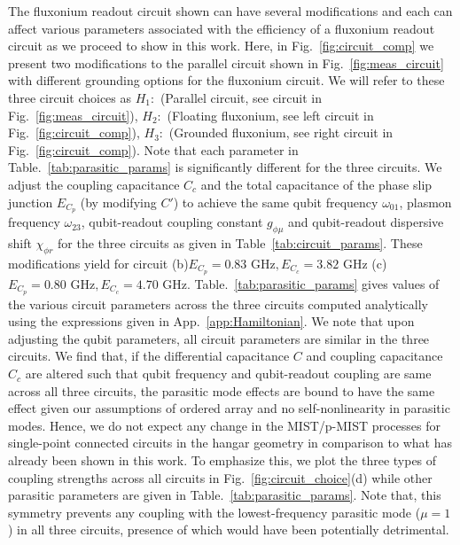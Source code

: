 \documentclass[%
reprint,
superscriptaddress,
 amsmath,amssymb,
 aps,
 prx,
longbibliography,
floatfix,
]{revtex4-2}
\begin{document}
The fluxonium readout circuit shown can have several modifications and each can affect various parameters associated with the efficiency of a fluxonium readout circuit as we proceed to show in this work. Here, in Fig.~\ref{fig:circuit_comp} we present two modifications to the parallel circuit shown in Fig.~\ref{fig:meas_circuit} with different grounding options for the fluxonium circuit. We will refer to these three circuit choices as $H_1:$ (Parallel circuit, see circuit in Fig.~\ref{fig:meas_circuit}), $H_2:$ (Floating fluxonium, see left circuit in Fig.~\ref{fig:circuit_comp}), $H_3:$ (Grounded fluxonium, see right circuit in Fig.~\ref{fig:circuit_comp}). Note that each parameter in Table.~\ref{tab:parasitic_params} is significantly different for the three circuits. We adjust the coupling capacitance $C_c$ and the total capacitance of the phase slip junction $E_{C_p}$ (by modifying $C'$) to achieve the same qubit frequency $\omega_{01}$, plasmon frequency $\omega_{23}$, qubit-readout coupling constant $g_{\phi \mu}$ and qubit-readout dispersive shift $\chi_{\phi r}$ for the three circuits as given in Table~\ref{tab:circuit_params}. These modifications yield for circuit (b)$E_{C_p}=0.83  \textrm{ GHz},E_{C_c}=3.82\textrm{ GHz}$ (c) $E_{C_p}=0.80\textrm{ GHz},E_{C_c}=4.70\textrm{ GHz}$. Table.~\ref{tab:parasitic_params} gives values of the various circuit parameters across the three circuits computed analytically using the expressions given in App.~\ref{app:Hamiltonian}. We note that upon adjusting the qubit parameters, all circuit parameters are similar in the three circuits. We find that, if the differential capacitance $C$ and coupling capacitance $C_c$ are altered such that qubit frequency and qubit-readout coupling are same across all three circuits, the parasitic mode effects are bound to have the same effect given our assumptions of ordered array and no self-nonlinearity in parasitic modes. Hence, we do not expect any change in the MIST/p-MIST processes for single-point connected circuits in the hangar geometry in comparison to what has already been shown in this work.
To emphasize this, we plot the three types of coupling strengths across all circuits in Fig.~\ref{fig:circuit_choice}(d) while other parasitic parameters are given in Table.~\ref{tab:parasitic_params}. Note that, this symmetry prevents any coupling with the lowest-frequency parasitic mode ($\mu=1$) in all three circuits, presence of which would have been potentially detrimental. 
\end{document}
